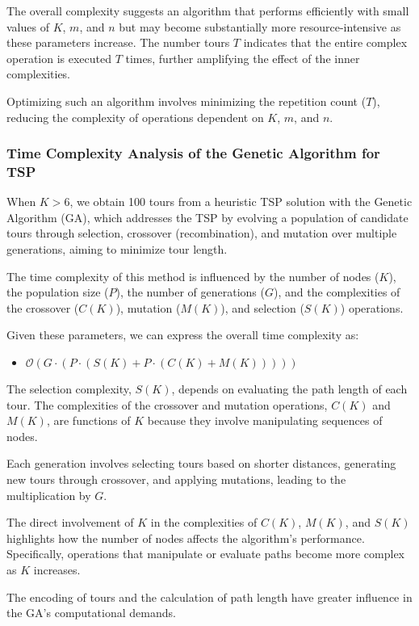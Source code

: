\documentclass[preprint,authoryear]{elsarticle}
\begin{document}
{The overall complexity suggests an algorithm that performs efficiently with small values of $K$, $m$, and $n$ but may become substantially more resource-intensive as these parameters increase. The number tours $T$ indicates that the entire complex operation is executed $T$ times, further amplifying the effect of the inner complexities.

Optimizing such an algorithm involves minimizing the repetition count ($T$), reducing the complexity of operations dependent on $K$, $m$, and $n$.


\subsubsection{Time Complexity Analysis of the Genetic Algorithm for TSP}
\label{ga_tsp}

When $K > 6$, we obtain 100 tours from a heuristic TSP solution with the Genetic Algorithm (GA), which addresses the TSP by evolving a population of candidate tours through selection, crossover (recombination), and mutation over multiple generations, aiming to minimize tour length.

The time complexity of this method is influenced by the number of nodes (\(K\)), the population size (\(P\)), the number of generations (\(G\)), and the complexities of the crossover (\(C(K)\)), mutation (\(M(K)\)), and selection (\(S(K)\)) operations.

Given these parameters, we can express the overall time complexity as:
\begin{itemize}
	\item $\mathcal{O}(G \cdot (P \cdot (S(K) + P \cdot (C(K) + M(K)))))$
\end{itemize}

The selection complexity, \(S(K)\), depends on evaluating the path length of each tour.
The complexities of the crossover and mutation operations, \(C(K)\) and \(M(K)\), are functions of \(K\) because they involve manipulating sequences of nodes.

Each generation involves selecting tours based on shorter distances, generating new tours through crossover, and applying mutations, leading to the multiplication by \(G\).

The direct involvement of \(K\) in the complexities of \(C(K)\), \(M(K)\), and \(S(K)\) highlights how the number of nodes affects the algorithm's performance. Specifically, operations that manipulate or evaluate paths become more complex as \(K\) increases.

The encoding of tours and the calculation of path length have greater influence in the GA's computational demands.

}
\end{document}
